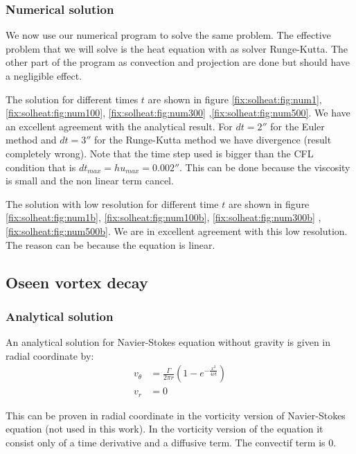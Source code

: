 \subsubsection{Numerical solution}

We now use our numerical program to solve the same problem. The effective problem that we will solve is the heat equation with as solver Runge-Kutta.
The other part of the program as convection and projection are done but should have a negligible effect.

The solution for different times $t$ are shown in figure \ref{fix:solheat:fig:num1}, \ref{fix:solheat:fig:num100}, \ref{fix:solheat:fig:num300} ,\ref{fix:solheat:fig:num500}. We have an excellent agreement with the analytical result.
For $dt=2\second$ for the Euler method and $dt=\unit{3}{\second}$ for the Runge-Kutta method we have divergence (result completely wrong).
Note that the time step used is bigger than the CFL condition that is $dt_{max}=hu_{max}=\unit{0.002}{\second}$. This can be done because the viscosity is small and the non linear term cancel.

The solution with low resolution for different time $t$ are shown in figure \ref{fix:solheat:fig:num1b}, \ref{fix:solheat:fig:num100b}, \ref{fix:solheat:fig:num300b} ,\ref{fix:solheat:fig:num500b}.
We are in excellent agreement with this low resolution. The reason can be because the equation is linear. 


\FloatBarrier
\subsection{Oseen vortex decay}

\subsubsection{Analytical solution}

An analytical solution for Navier-Stokes equation without gravity is given in radial coordinate by:
\begin{align}\label{fixed:vortex}
 v_{\theta}&=\frac{\Gamma}{2\pi r}\left(1-e^{-\frac{x^2}{4\nu t}}\right)\\
 v_{r}&=0
\end{align}

This can be proven in radial coordinate in the vorticity version of Navier-Stokes equation (not used in this work).
In the vorticity version of the equation it consist only of a time derivative and a diffusive term.
The convectif term is 0.

